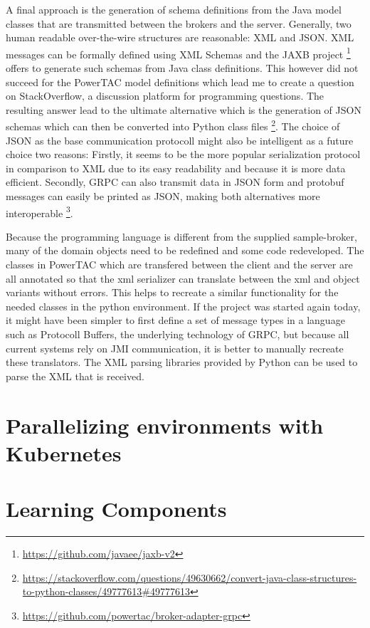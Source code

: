 A final approach is the generation of schema definitions from the Java model classes that are transmitted between the
brokers and the server. Generally, two human readable over-the-wire structures are reasonable: \ac {XML} and \ac{JSON}.
\ac {XML} messages can be formally defined using \ac {XML} Schemas and the \ac{JAXB} project
\footnote{\url{https://github.com/javaee/jaxb-v2}} offers to generate such schemas from Java class definitions. This
however did not succeed for the \ac {PowerTAC} model definitions which lead me to create a question on StackOverflow, a
discussion platform for programming questions. The resulting answer lead to the ultimate alternative which is the
generation of \ac {JSON} schemas which can then be converted into Python class files
\footnote{\url{https://stackoverflow.com/questions/49630662/convert-java-class-structures-to-python-classes/49777613\#49777613}}.
The choice of \ac {JSON} as the base communication protocoll might also be intelligent as a future choice two reasons:
Firstly, it seems to be the more popular serialization protocol in comparison to \ac {XML} \citep{jsonxml} due to its
easy readability and because it is more data efficient. Secondly, \ac {GRPC} can also transmit data in \ac {JSON} form
and protobuf messages can easily be printed as \ac {JSON}, making both alternatives more interoperable
\footnote{\url{https://github.com/powertac/broker-adapter-grpc} }.

Because the programming language is different from the supplied sample-broker, many of the domain objects need to be
redefined and some code redeveloped. The classes in \ac {PowerTAC} which are transfered between the client and the
server are all annotated so that the xml serializer can translate between the xml and object variants without errors.
This helps to recreate a similar functionality for the needed classes in the python environment. If the project was
started again today, it might have been simpler to first define a set of message types in a language such as Protocoll
Buffers, the underlying technology of \ac {GRPC}, but because all current systems rely on \ac {JMI} communication, it is
better to manually recreate these translators. The \ac {XML} parsing libraries provided by Python can be used to parse
the \ac {XML} that is received.  \section{Parallelizing environments with Kubernetes}

\section{Learning Components}

